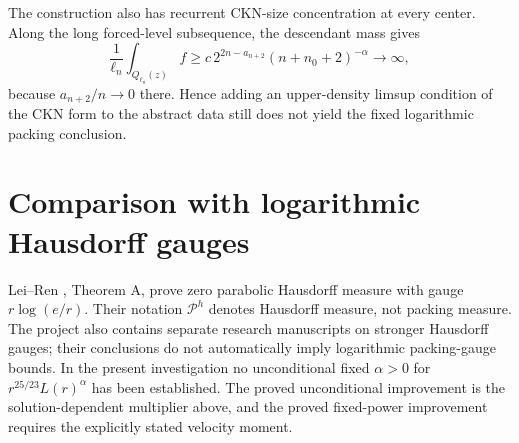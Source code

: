 \documentclass[11pt]{article}
\begin{document}
The construction also has recurrent CKN-size concentration at every center. Along the long forced-level subsequence, the descendant mass gives
$$
\frac1{\ell_n}\int_{Q_{\ell_n}(z)}f
\ge c\,2^{2n-a_{n+2}}(n+n_0+2)^{-\alpha}\longrightarrow\infty,
$$
because $a_{n+2}/n\to0$ there. Hence adding an upper-density limsup condition of the CKN form to the abstract data still does not yield the fixed logarithmic packing conclusion.

\section{Comparison with logarithmic Hausdorff gauges}
Lei--Ren \cite{LR}, Theorem A, prove zero parabolic Hausdorff measure with gauge $r\log(e/r)$. Their notation $\mathcal P^h$ denotes Hausdorff measure, not packing measure. The project also contains separate research manuscripts on stronger Hausdorff gauges; their conclusions do not automatically imply logarithmic packing-gauge bounds. In the present investigation no unconditional fixed $\alpha>0$ for $r^{25/23}L(r)^\alpha$ has been established. The proved unconditional improvement is the solution-dependent multiplier above, and the proved fixed-power improvement requires the explicitly stated velocity moment.
\end{document}
